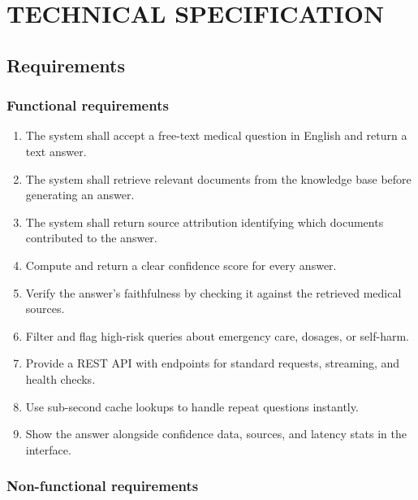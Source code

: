\chapter{\MakeUppercase{Technical Specification}}

\section{Requirements}

\subsection{Functional requirements}

\begin{enumerate}
    \item The system shall accept a free-text medical question in English and return a text answer.
    \item The system shall retrieve relevant documents from the knowledge base before generating an answer.
    \item The system shall return source attribution identifying \allowbreak{}which documents contributed to the answer.
    \item Compute and return a clear confidence score for every answer.
    \item Verify the answer's faithfulness by checking it against the retrieved medical sources.
    \item Filter and flag high-risk queries about emergency care, dosages, or self-harm.
    \item Provide a REST API with endpoints for standard requests, streaming, and health checks.
    \item Use sub-second cache lookups to handle repeat questions instantly.
    \item Show the answer alongside confidence data, sources, and latency stats in the interface.
\end{enumerate}

\subsection{Non-functional requirements}

